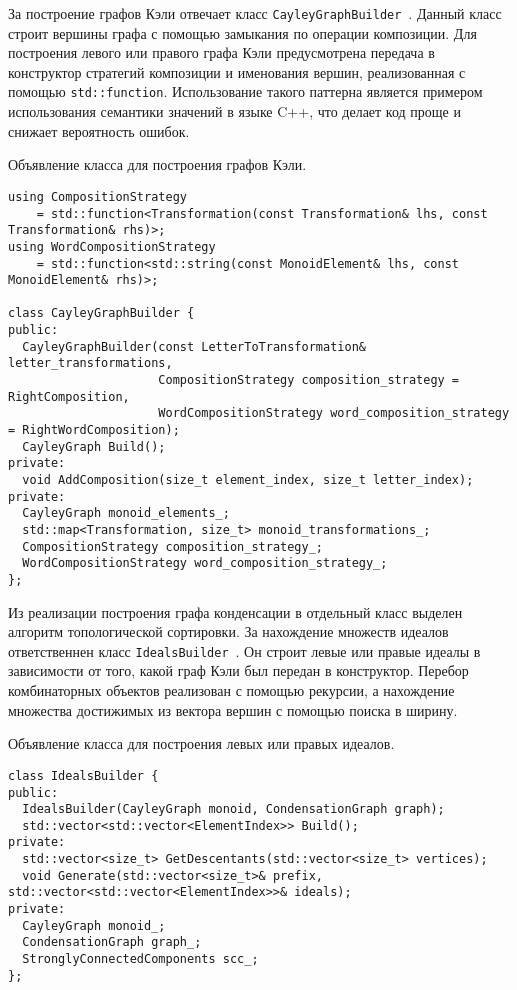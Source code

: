 \documentclass[14pt, russian]{scrartcl}
\begin{document}
За построение графов Кэли отвечает класс
\verb|CayleyGraphBuilder|~. Данный класс строит
вершины графа с помощью замыкания по операции композиции. Для построения левого
или правого графа Кэли предусмотрена передача в конструктор стратегий композиции
и именования вершин, реализованная с помощью \verb|std::function|. Использование
такого паттерна является примером использования семантики значений в языке C++,
что делает код проще и снижает вероятность ошибок.

\begin{listing}[!htb]
\caption{Объявление класса для построения графов Кэли.}
\label{lst:graph_builder}
  \begin{verbatim}
using CompositionStrategy
    = std::function<Transformation(const Transformation& lhs, const Transformation& rhs)>;
using WordCompositionStrategy
    = std::function<std::string(const MonoidElement& lhs, const MonoidElement& rhs)>;

class CayleyGraphBuilder {
public:
  CayleyGraphBuilder(const LetterToTransformation& letter_transformations,
                     CompositionStrategy composition_strategy = RightComposition,
                     WordCompositionStrategy word_composition_strategy = RightWordComposition);
  CayleyGraph Build();
private:
  void AddComposition(size_t element_index, size_t letter_index);
private:
  CayleyGraph monoid_elements_;
  std::map<Transformation, size_t> monoid_transformations_;
  CompositionStrategy composition_strategy_;
  WordCompositionStrategy word_composition_strategy_;
};
  \end{verbatim}
\end{listing}

Из реализации построения графа конденсации в отдельный класс выделен алгоритм
топологической сортировки. За нахождение множеств идеалов ответственнен класс
\verb|IdealsBuilder|~. Он строит левые или
правые идеалы в зависимости от того, какой граф Кэли был передан в конструктор.
Перебор комбинаторных объектов реализован с помощью рекурсии, а нахождение
множества достижимых из вектора вершин с помощью поиска в ширину.

\begin{listing}[!htb]
\caption{Объявление класса для построения левых или правых идеалов.}
\label{lst:ideals_builder_impl}
  \begin{verbatim}
class IdealsBuilder {
public:
  IdealsBuilder(CayleyGraph monoid, CondensationGraph graph);
  std::vector<std::vector<ElementIndex>> Build();
private:
  std::vector<size_t> GetDescentants(std::vector<size_t> vertices);
  void Generate(std::vector<size_t>& prefix, std::vector<std::vector<ElementIndex>>& ideals);
private:
  CayleyGraph monoid_;
  CondensationGraph graph_;
  StronglyConnectedComponents scc_;
};
  \end{verbatim}
\end{listing}
\end{document}
